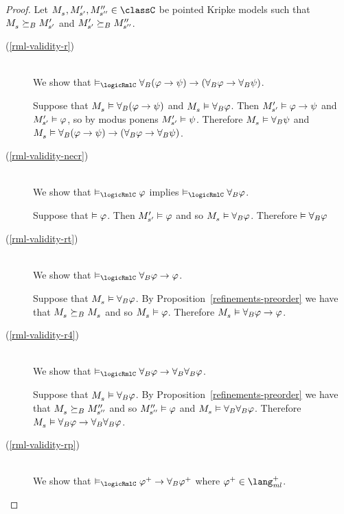 \begin{proof}
Let $\kPModel{\kStateS}, \kPModelP{\kStateSP}, \kPModelPP{\kStateSPP} \in \classC$ be pointed Kripke models such that $\kPModel{\kStateS} \simulatesBs \kPModelP{\kStateSP}$ and ${M^{\prime}_{{s}^{\prime}}} \succeq_{B} {M^{\prime\prime}_{{s}^{\prime\prime}}}$.
\begin{description}
    \item[(\ref{rml-validity-r})]  \hfill \\
        We show that $\entails_\logicRmlC \allrefsBs (\phi \implies \psi) \implies (\allrefsBs \phi \implies \allrefsBs \psi)$.

        Suppose that $\kPModel{\kStateS} \entails \allrefsBs (\phi \implies \psi)$ and $\kPModel{\kStateS} \entails \allrefsBs \phi$.
        Then ${M^{\prime}_{{s}^{\prime}}} \vDash \varphi \rightarrow \psi$
        and ${M^{\prime}_{{s}^{\prime}}} \vDash \varphi$,
        so by modus ponens ${M^{\prime}_{{s}^{\prime}}} \vDash \psi$.
        Therefore $\kPModel{\kStateS} \entails \allrefsBs \psi$
        and $\kPModel{\kStateS} \entails \allrefsBs (\phi \implies \psi) \implies (\allrefsBs \phi \implies \allrefsBs \psi)$.
    \item[(\ref{rml-validity-necr})] \hfill \\
        We show that $\entails_\logicRmlC \phi$ implies $\entails_\logicRmlC \allrefsBs \phi$.

        Suppose that $\vDash \varphi$. 
        Then ${M^{\prime}_{{s}^{\prime}}} \vDash \varphi$ and so $\kPModel{\kStateS} \entails \allrefsBs \phi$.
        Therefore $\vDash {\forall_{B}} \varphi$
    \item[(\ref{rml-validity-rt})] \hfill \\
        We show that $\entails_\logicRmlC \allrefsBs \phi \implies \phi$.

        Suppose that $\kPModel{\kStateS} \entails \allrefsBs \phi$.
        By Proposition~\ref{refinements-preorder} we have that $\kPModel{\kStateS} \simulatesBs \kPModel{\kStateS}$ and so $\kPModel{\kStateS} \entails \phi$.
        Therefore $\kPModel{\kStateS} \entails \allrefsBs \phi \implies \phi$.
    \item[(\ref{rml-validity-r4})] \hfill \\
        We show that $\entails_\logicRmlC \allrefsBs \phi \implies \allrefsBs \allrefsBs \phi$.

        Suppose that $\kPModel{\kStateS} \entails \allrefsBs \phi$.
        By Proposition~\ref{refinements-preorder} we have that $\kPModel{\kStateS} \simulatesBs \kPModelPP{\kStateSPP}$ and so ${M^{\prime\prime}_{{s}^{\prime\prime}}} \vDash \varphi$ and $\kPModel{\kStateS} \entails \allrefsBs \allrefsBs \phi$.
        Therefore $\kPModel{\kStateS} \entails \allrefsBs \phi \implies \allrefsBs \allrefsBs \phi$.
    \item[(\ref{rml-validity-rp})] \hfill \\
        We show that $\entails_\logicRmlC \phi^+ \implies \allrefsBs \phi^+$ where $\phi^+ \in \langMlPlus$.


\end{description}
\end{proof}
